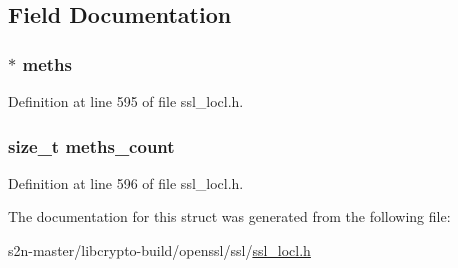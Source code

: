 \subsection{Field Documentation}
\subsubsection[{\texorpdfstring{meths}{meths}}]{$\ast$ meths}\hypertarget{structcustom__ext__methods_abd441cd18172308780c24e75d50d2ad6}{}\label{structcustom__ext__methods_abd441cd18172308780c24e75d50d2ad6}


Definition at line 595 of file ssl\+\_\+locl.\+h.

\subsubsection[{\texorpdfstring{meths\+\_\+count}{meths_count}}]{\setlength{\rightskip}{0pt plus 5cm}size\+\_\+t meths\+\_\+count}\hypertarget{structcustom__ext__methods_a0fd4e0f2c0a9a79f2fb7249c3eb58111}{}\label{structcustom__ext__methods_a0fd4e0f2c0a9a79f2fb7249c3eb58111}


Definition at line 596 of file ssl\+\_\+locl.\+h.



The documentation for this struct was generated from the following file\+:\begin{DoxyCompactItemize}
\item 
s2n-\/master/libcrypto-\/build/openssl/ssl/\hyperlink{ssl__locl_8h}{ssl\+\_\+locl.\+h}\end{DoxyCompactItemize}
